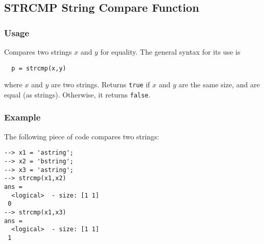 %
%
%
\subsection{STRCMP String Compare Function}
\subsubsection{Usage}
Compares two strings $x$ and $y$ for equality.  The general
syntax for its use is
\begin{verbatim}
  p = strcmp(x,y)
\end{verbatim}
where $x$ and $y$ are two strings.  Returns \verb|true| if $x$
and $y$ are the same size, and are equal (as strings).  Otherwise,
it returns \verb|false|.
\subsubsection{Example}
The following piece of code compares two strings:
\begin{verbatim}
--> x1 = 'astring';
--> x2 = 'bstring';
--> x3 = 'astring';
--> strcmp(x1,x2)
ans =
  <logical>  - size: [1 1]
 0
--> strcmp(x1,x3)
ans =
  <logical>  - size: [1 1]
 1
\end{verbatim}

